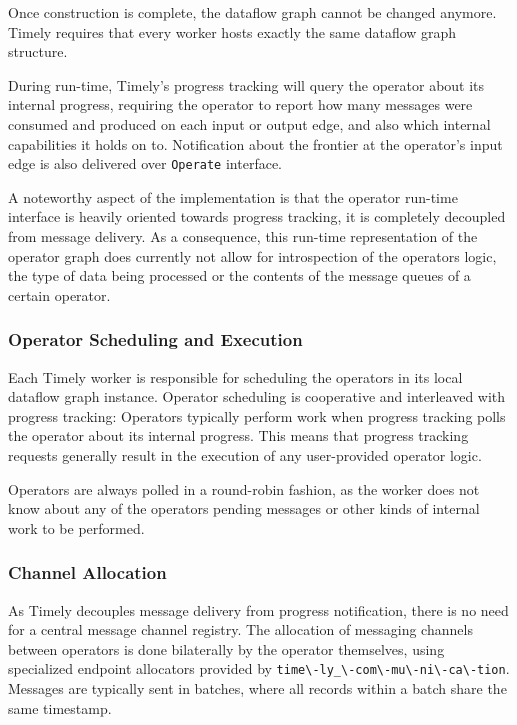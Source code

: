 Once construction is complete, the dataflow graph cannot be changed anymore.
Timely requires that every worker hosts exactly the same dataflow graph
structure.

During run-time, Timely's progress tracking will query the operator about its
internal progress, requiring the operator to report how many messages were
consumed and produced on each input or output edge, and also which internal
capabilities it holds on to. Notification about the frontier at the
operator's input edge is also delivered over \lstinline{Operate} interface.

A noteworthy aspect of the implementation is that the operator run-time interface
is heavily oriented towards progress tracking, it is completely decoupled
from message delivery.
As a consequence, this run-time representation of the operator graph does
currently not allow for introspection of the operators logic, the type of data
being processed or the contents of the message queues of a certain operator.

\subsubsection{Operator Scheduling and Execution}

Each Timely worker is responsible for scheduling the operators in its local
dataflow graph instance. Operator scheduling is cooperative and interleaved 
with progress tracking: Operators typically perform work when progress tracking
polls the operator about its internal progress. This means that progress
tracking requests generally result in the execution of any user-provided
operator logic.

Operators are always polled in a round-robin fashion, as the worker does
not know about any of the operators pending messages or other kinds of
internal work to be performed.

\subsubsection{Channel Allocation}

As Timely decouples message delivery from progress notification, there is no
need for a central message channel registry. The allocation of messaging
channels between operators is done bilaterally by the operator themselves,
using specialized endpoint allocators provided by
\lstinline{time\-ly_\-com\-mu\-ni\-ca\-tion}. Messages are typically sent in
batches, where all records within a batch share the same timestamp.

